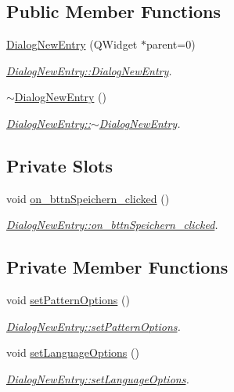 \subsection*{Public Member Functions}
\begin{DoxyCompactItemize}
\item 
\hyperlink{class_dialog_new_entry_adf5d314059f2ddb1d49035df63279b47}{Dialog\+New\+Entry} (Q\+Widget $\ast$parent=0)
\begin{DoxyCompactList}\small\item\em \hyperlink{class_dialog_new_entry_adf5d314059f2ddb1d49035df63279b47}{Dialog\+New\+Entry\+::\+Dialog\+New\+Entry}. \end{DoxyCompactList}\item 
\hyperlink{class_dialog_new_entry_aea9c132ba82fba5dc62a017257be0e89}{$\sim$\+Dialog\+New\+Entry} ()
\begin{DoxyCompactList}\small\item\em \hyperlink{class_dialog_new_entry_aea9c132ba82fba5dc62a017257be0e89}{Dialog\+New\+Entry\+::$\sim$\+Dialog\+New\+Entry}. \end{DoxyCompactList}\end{DoxyCompactItemize}
\subsection*{Private Slots}
\begin{DoxyCompactItemize}
\item 
void \hyperlink{class_dialog_new_entry_a3ca9da6355dbe206ea01975d2b37e72a}{on\+\_\+bttn\+Speichern\+\_\+clicked} ()
\begin{DoxyCompactList}\small\item\em \hyperlink{class_dialog_new_entry_a3ca9da6355dbe206ea01975d2b37e72a}{Dialog\+New\+Entry\+::on\+\_\+bttn\+Speichern\+\_\+clicked}. \end{DoxyCompactList}\end{DoxyCompactItemize}
\subsection*{Private Member Functions}
\begin{DoxyCompactItemize}
\item 
void \hyperlink{class_dialog_new_entry_a419783c0f14219c207dcd5946fc302a2}{set\+Pattern\+Options} ()
\begin{DoxyCompactList}\small\item\em \hyperlink{class_dialog_new_entry_a419783c0f14219c207dcd5946fc302a2}{Dialog\+New\+Entry\+::set\+Pattern\+Options}. \end{DoxyCompactList}\item 
void \hyperlink{class_dialog_new_entry_a23ba49e12a08f09848d5d72a772e5a0e}{set\+Language\+Options} ()
\begin{DoxyCompactList}\small\item\em \hyperlink{class_dialog_new_entry_a23ba49e12a08f09848d5d72a772e5a0e}{Dialog\+New\+Entry\+::set\+Language\+Options}. \end{DoxyCompactList}\end{DoxyCompactItemize}
